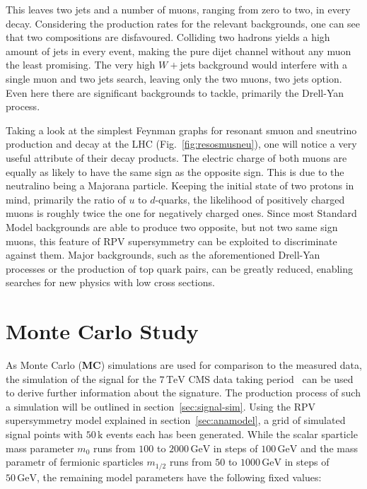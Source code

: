 This leaves two jets and a number of muons, ranging from zero to two, in every decay. Considering the production rates for the relevant backgrounds, one can see that two compositions are disfavoured. Colliding two hadrons yields a high amount of jets in every event, making the pure dijet channel without any muon the least promising. The very high $W + \text{jets}$ background would interfere with a single muon and two jets search, leaving only the two muons, two jets option. Even here there are significant backgrounds to tackle, primarily the Drell-Yan process.

Taking a look at the simplest Feynman graphs for resonant smuon and sneutrino production and decay at the LHC (Fig.~\ref{fig:resosmusneu}), one will notice a very useful attribute of their decay products. The electric charge of both muons are equally as likely to have the same sign as the opposite sign. This is due to the neutralino being a Majorana particle. Keeping the initial state of two protons in mind, primarily the ratio of $u$ to $d$-quarks, the likelihood of positively charged muons is roughly twice the one for negatively charged ones. Since most Standard Model backgrounds are able to produce two opposite, but not two same sign muons, this feature of RPV supersymmetry can be exploited to discriminate against them. Major backgrounds, such as the aforementioned Drell-Yan processes or the production of top quark pairs, can be greatly reduced, enabling searches for new physics with low cross sections.


\section{Monte Carlo Study}
\label{sec:mcstudy}

As Monte Carlo (\textbf{MC}) simulations are used for comparison to the measured data, the simulation of the signal for the $7\,\text{TeV}$ CMS data taking period~\cite{2011rpv} can be used to derive further information about the signature. The production process of such a simulation will be outlined in section~\ref{sec:signal-sim}. Using the RPV supersymmetry model explained in section~\ref{sec:anamodel}, a grid of simulated signal points with $50\,\text{k}$ events each has been generated. While the scalar sparticle mass parameter $m_0$ runs from $100$ to $2000\,\text{GeV}$ in steps of $100\,\text{GeV}$ and the mass parametr of fermionic sparticles $m_{1/2}$ runs from $50$ to $1000\,\text{GeV}$ in steps of $50\,\text{GeV}$, the remaining model parameters have the following fixed values:

